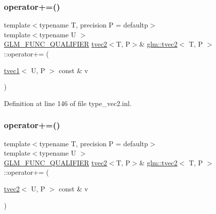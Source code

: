 \mbox{\label{structglm_1_1tvec2_a977134a069d9e6fec28d33204ed68019}} 
\subsubsection{\texorpdfstring{operator+=()}{operator+=()}\hspace{0.1cm}{\footnotesize\ttfamily [5/6]}}
{\footnotesize\ttfamily template$<$typename T, precision P = defaultp$>$ \\
template$<$typename U $>$ \\
\mbox{\hyperlink{setup_8hpp_a33fdea6f91c5f834105f7415e2a64407}{G\+L\+M\+\_\+\+F\+U\+N\+C\+\_\+\+Q\+U\+A\+L\+I\+F\+I\+ER}} \mbox{\hyperlink{structglm_1_1tvec2}{tvec2}}$<$T, P$>$\& \mbox{\hyperlink{structglm_1_1tvec2}{glm\+::tvec2}}$<$ T, P $>$\+::operator+= (\begin{DoxyParamCaption}\item[{\mbox{\hyperlink{structglm_1_1tvec1}{tvec1}}$<$ U, P $>$ const \&}]{v }\end{DoxyParamCaption})}



Definition at line 146 of file type\+\_\+vec2.\+inl.

\mbox{\label{structglm_1_1tvec2_aa986a740e1ba345aa71814bb2a08e597}} 
\subsubsection{\texorpdfstring{operator+=()}{operator+=()}\hspace{0.1cm}{\footnotesize\ttfamily [6/6]}}
{\footnotesize\ttfamily template$<$typename T, precision P = defaultp$>$ \\
template$<$typename U $>$ \\
\mbox{\hyperlink{setup_8hpp_a33fdea6f91c5f834105f7415e2a64407}{G\+L\+M\+\_\+\+F\+U\+N\+C\+\_\+\+Q\+U\+A\+L\+I\+F\+I\+ER}} \mbox{\hyperlink{structglm_1_1tvec2}{tvec2}}$<$T, P$>$\& \mbox{\hyperlink{structglm_1_1tvec2}{glm\+::tvec2}}$<$ T, P $>$\+::operator+= (\begin{DoxyParamCaption}\item[{\mbox{\hyperlink{structglm_1_1tvec2}{tvec2}}$<$ U, P $>$ const \&}]{v }\end{DoxyParamCaption})}



